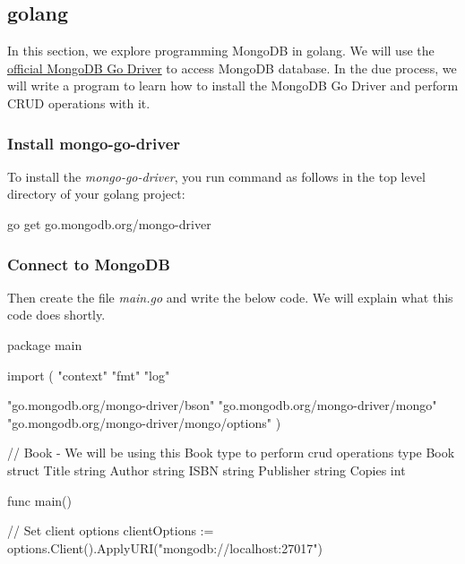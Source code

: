 \documentclass[12pt]{article}
\begin{document}
\begin{bashcode}
\begin{bashcode}
\subsection{golang}

In this section, we explore programming MongoDB in golang. We will use
the \href{https://github.com/mongodb/mongo-go-driver/}{official MongoDB
Go Driver} to access MongoDB database. In the due process, we will write
a program to learn how to install the MongoDB Go Driver and perform CRUD
operations with it.

\subsubsection{Install mongo-go-driver}
To install the \emph{mongo-go-driver}, you run command as follows in
the top level directory of your golang project:

\begin{bashcode}
go get go.mongodb.org/mongo-driver
\end{bashcode}

\subsubsection{Connect to MongoDB}
Then create the file \emph{main.go} and write the below code. We will explain
what this code does shortly.

\begin{golangcode}
package main

import (
    "context"
    "fmt"
    "log"

    "go.mongodb.org/mongo-driver/bson"
    "go.mongodb.org/mongo-driver/mongo"
    "go.mongodb.org/mongo-driver/mongo/options"
)

// Book - We will be using this Book type to perform crud operations
type Book struct {
  Title     string
  Author    string
  ISBN      string
  Publisher string
  Copies    int
}

func main() {

  // Set client options
  clientOptions := options.Client().ApplyURI("mongodb://localhost:27017")

}
\end{golangcode}
\end{bashcode}
\end{bashcode}
\end{document}
